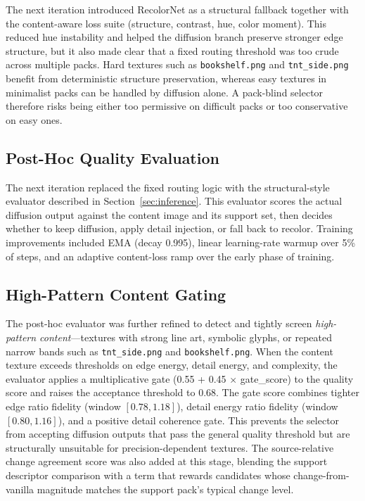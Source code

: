 The next iteration introduced RecolorNet as a structural fallback together
with the content-aware loss suite (structure, contrast, hue, color moment).
This reduced hue instability and helped the diffusion branch preserve stronger
edge structure, but it also made clear that a fixed routing threshold was too
crude across multiple packs. Hard textures such as \texttt{bookshelf.png} and
\texttt{tnt\_side.png} benefit from deterministic structure preservation,
whereas easy textures in minimalist packs can be handled by diffusion alone.
A pack-blind selector therefore risks being either too permissive on difficult
packs or too conservative on easy ones.

\subsection{Post-Hoc Quality Evaluation}

The next iteration replaced the fixed routing logic with the structural-style
evaluator described in Section~\ref{sec:inference}. This evaluator scores the
actual diffusion output against the content image and its support set, then
decides whether to keep diffusion, apply detail injection, or fall back to
recolor. Training improvements included EMA (decay 0.995), linear
learning-rate warmup over 5\% of steps, and an adaptive content-loss ramp over
the early phase of training.

\subsection{High-Pattern Content Gating}

The post-hoc evaluator was further refined to detect and tightly screen
\emph{high-pattern content}---textures with strong line art, symbolic glyphs,
or repeated narrow bands such as \texttt{tnt\_side.png} and
\texttt{bookshelf.png}. When the content texture exceeds thresholds on edge
energy, detail energy, and complexity, the evaluator applies a multiplicative
gate (0.55 + 0.45 $\times$ gate\_score) to the quality score and raises the
acceptance threshold to 0.68. The gate score combines tighter edge ratio
fidelity (window $[0.78, 1.18]$), detail energy ratio fidelity (window
$[0.80, 1.16]$), and a positive detail coherence gate. This prevents the
selector from accepting diffusion outputs that pass the general quality
threshold but are structurally unsuitable for precision-dependent textures.
The source-relative change agreement score was also added at this stage,
blending the support descriptor comparison with a term that rewards candidates
whose change-from-vanilla magnitude matches the support pack's typical change
level.


